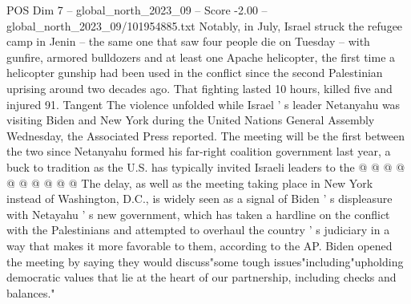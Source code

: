 \begin{textsample}{POS Dim 7 – global\_north\_2023\_09 – Score -2.00 – global\_north\_2023\_09/101954885.txt}
Notably, in July, Israel struck the refugee camp in Jenin -- the same one that saw four people die on Tuesday -- with gunfire, armored bulldozers and at least one Apache helicopter, the first time a helicopter gunship had been used in the conflict since the second Palestinian uprising around two decades ago.
That fighting lasted 10 hours, killed five and injured 91.
Tangent The violence unfolded while Israel ' s leader Netanyahu was visiting Biden and New York during the United Nations General Assembly Wednesday, the Associated Press reported.
The meeting will be the first between the two since Netanyahu formed his far-right coalition government last year, a buck to tradition as the U.S. has typically invited Israeli leaders to the @ @ @ @ @ @ @ @ @ @ The delay, as well as the meeting taking place in New York instead of Washington, D.C., is widely seen as a signal of Biden ' s displeasure with Netayahu ' s new government, which has taken a hardline on the conflict with the Palestinians and attempted to overhaul the country ' s judiciary in a way that makes it more favorable to them, according to the AP.
Biden opened the meeting by saying they would discuss"some tough issues"including"upholding democratic values that lie at the heart of our partnership, including checks and balances."

\end{textsample}
